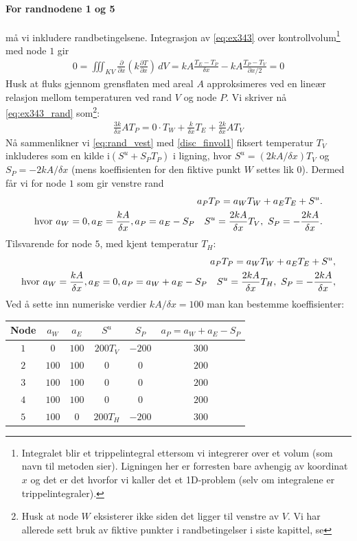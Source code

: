 \paragraph{For randnodene 1 og 5 }må vi inkludere randbetingelsene. Integrasjon av \eqref{eq:ex343} over kontrollvolum\footnote{Integralet blir et trippelintegral ettersom vi integrerer over et volum (som navn til metoden sier). Ligningen her er forresten bare avhengig av koordinat $x$ og det er det hvorfor vi kaller det et 1D-problem (selv om integralene er trippelintegraler).} med node $1$ gir 
\begin{align}\label{eq:ex343_rand}
0= \iiint_{KV} \frac{\partial}{\partial x}\left(k\frac{\partial T}{\partial x}\right) \, dV = kA\frac{T_E-T_P}{\delta x} -kA\frac{T_P-T_V}{\partial x/2}=0
\end{align}
Husk at fluks gjennom grensflaten med areal $A$ approksimeres ved en lineær relasjon mellom temperaturen ved rand $V$ og node $P$. Vi skriver nå \eqref{eq:ex343_rand} som\footnote{Husk at node $W$ eksisterer ikke siden det ligger til venstre av $V$. Vi har allerede sett bruk av fiktive punkter i randbetingelser i siste kapittel, se }:
\begin{align}\label{eq:rand_vest}
\frac{3k}{\delta x} A T_P = 0\cdot T_W + \frac{k}{\delta x} T_E + \frac{2k}{\delta x} A T_V
\end{align}
Nå sammenlikner vi \eqref{eq:rand_vest} med \eqref{disc_finvol1} fiksert temperatur $T_V$ inkluderes som  en kilde i$(S^u+S_PT_P)$ i ligning, hvor $S^u=(2kA/\delta x)T_V$ og $S_P = -2kA/\delta x$ (mens koeffisienten for den fiktive punkt $W$ settes lik $0$).
Dermed får vi for node $1$ som gir venstre rand
\begin{align}\label{eq:ex343_rand1}
a_P T_P = a_W T_W +a_E  T_E + S^u.\notag \\ \text{hvor } a_W=0, a_E = \frac{kA}{\delta x}, a_P = a_E - S_P  \quad S^u = \frac{2kA}{\delta x} T_V, \ S_P = -\frac{2kA}{\delta x}. 
\end{align}
Tilsvarende for node $5$, med kjent temperatur $T_H$:
\begin{align}\label{eq:ex343_rand5}
a_P T_P = a_W T_W + a_E T_E + S^u, \notag\\ 
\text{hvor } a_W=\frac{kA}{\delta x}, a_E = 0, a_P = a_W +a_E - S_P  \quad S^u = \frac{2kA}{\delta x} T_H, \ S_P = -\frac{2kA}{\delta x},
\end{align}
Ved å sette inn numeriske verdier $kA/\delta x = 100$ man kan bestemme koeffisienter:
\begin{center}
\begin{tabular}{|c|c|c|c|c|c|}
\hline
Node & $a_W$ & $a_E$ & $S^u$ & $S_P$ & $a_P=a_W+a_E-S_P$ \\
\hline
$1$ & $0$ & $100$ & $200T_V$ & $-200$ & $300$ \\
$2$ & $100$ & $100$ &  $0$ &  $0$ & $200$ \\
$3$ & $100$ & $100$ &  $0$ &  $0$ & $200$ \\
$4$ & $100$ & $100$ &  $0$ &  $0$ & $200$ \\
$5$ & $100$ & $0$ & $200T_H$ & $-200$ & $300$ \\
\hline
\end{tabular}
\end{center}
